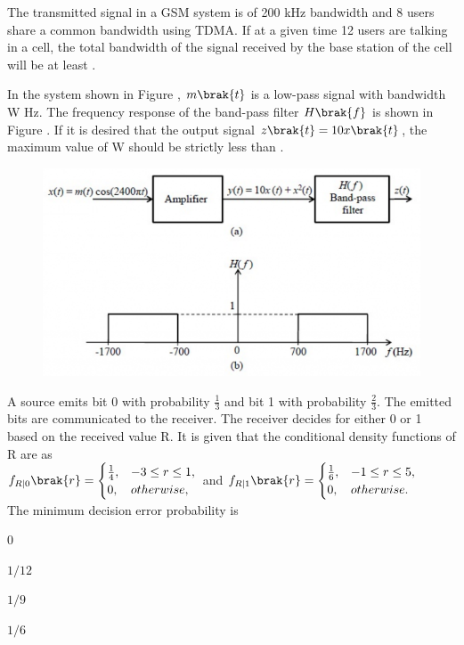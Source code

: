     \hfill{}

    \item The transmitted signal in a GSM system is of 200 kHz bandwidth and 8 users share a common bandwidth using TDMA. If at a given time 12 users are talking in a cell, the total bandwidth of the signal received by the base station of the cell will be at least  \underline{\hspace{2cm}}.
    
    \hfill{}

    \item In the system shown in Figure , $m\brak{t}$ is a low-pass signal with bandwidth W Hz. The frequency response of the band-pass filter $H\brak{f}$ is shown in Figure . If it is desired that the output signal $z\brak{t}=10x\brak{t}$, the maximum value of W  should be strictly less than \underline{\hspace{2cm}}.
    \begin{figure}[H]
        \centering
        \includegraphics[width=0.8\columnwidth]{figs/q61.png}
        \caption*{}
        \label{fig:q61}
    \end{figure}
    
    \hfill{}

    \item A source emits bit 0 with probability $\frac{1}{3}$ and bit 1 with probability $\frac{2}{3}$. The emitted bits are communicated to the receiver. The receiver decides for either 0 or 1 based on the received value R. It is given that the conditional density functions of R are as\\$f_{R|0}\brak{r}=\begin{cases}\frac{1}{4}, & -3\le r\le1,\\ 0, & otherwise,\end{cases}$ and $f_{R|1}\brak{r}=\begin{cases}\frac{1}{6}, & -1\le r\le5,\\ 0, & otherwise.\end{cases}$\\The minimum decision error probability is
    \begin{enumerate}
        \begin{multicols}{2}
            \item 0
            \item $1/12$
            \item $1/9$
            \item $1/6$
        \end{multicols}
    \end{enumerate}
    
